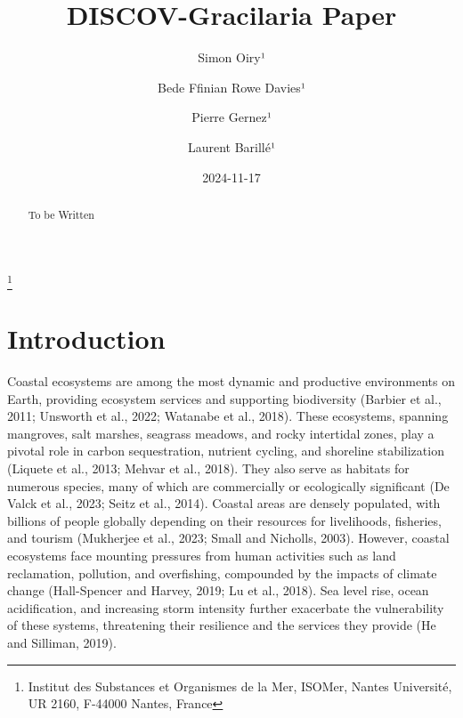 \documentclass[
  letterpaper,
  DIV=11,
  numbers=noendperiod]{scrartcl}
\title{DISCOV-Gracilaria Paper}
\author{Simon Oiry¹ \and Bede Ffinian Rowe Davies¹ \and Pierre
Gernez¹ \and Laurent Barillé¹}
\date{2024-11-17}
\begin{document}
\maketitle
\begin{abstract}
To be Written
\end{abstract}


\footnote{Institut des Substances et Organismes de la Mer, ISOMer,
  Nantes Université, UR 2160, F-44000 Nantes, France}

\section{Introduction}\label{introduction}

Coastal ecosystems are among the most dynamic and productive
environments on Earth, providing ecosystem services and supporting
biodiversity (Barbier et al., 2011; Unsworth et al., 2022; Watanabe et
al., 2018). These ecosystems, spanning mangroves, salt marshes, seagrass
meadows, and rocky intertidal zones, play a pivotal role in carbon
sequestration, nutrient cycling, and shoreline stabilization (Liquete et
al., 2013; Mehvar et al., 2018). They also serve as habitats for
numerous species, many of which are commercially or ecologically
significant (De Valck et al., 2023; Seitz et al., 2014). Coastal areas
are densely populated, with billions of people globally depending on
their resources for livelihoods, fisheries, and tourism (Mukherjee et
al., 2023; Small and Nicholls, 2003). However, coastal ecosystems face
mounting pressures from human activities such as land reclamation,
pollution, and overfishing, compounded by the impacts of climate change
(Hall-Spencer and Harvey, 2019; Lu et al., 2018). Sea level rise, ocean
acidification, and increasing storm intensity further exacerbate the
vulnerability of these systems, threatening their resilience and the
services they provide (He and Silliman, 2019).
\end{document}
